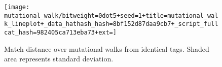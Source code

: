 \begin{sidewaysfigure}
\vspace{100ex}
\begin{center}
\texttt{[image: mutational\_walk/bitweight=0dot5+seed=1+title=mutational\_walk\_lineplot+\_data\_hathash\_hash=8bf152d87daa9cb7+\_script\_fullcat\_hash=982405ca713eba73+ext=]}
\caption{
Match distance over mutational walks from identical tags.
Shaded area represents standard deviation.
}
\label{fig:mutational_walk_lineplot}

\end{center}
\end{sidewaysfigure}

